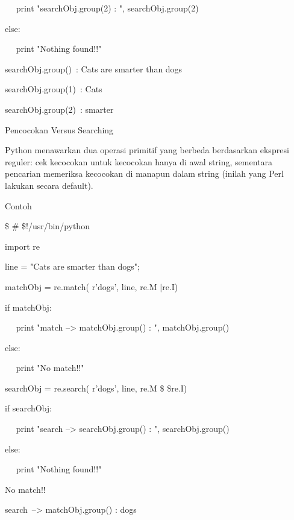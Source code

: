 \noindent 
~~ print "searchObj.group(2) : ", searchObj.group(2) \par
\noindent 
else: \par
\noindent 
~~ print "Nothing found!!" \par
\vspace{12pt}
\noindent 
searchObj.group()~:  Cats are smarter than dogs \par
\noindent 
searchObj.group(1)~:  Cats \par
\noindent 
searchObj.group(2)~:  smarter \par
\noindent 
Pencocokan Versus Searching \par
\vspace{12pt}
Python menawarkan dua operasi primitif yang berbeda berdasarkan ekspresi reguler: cek kecocokan untuk kecocokan hanya di awal string, sementara pencarian memeriksa kecocokan di manapun dalam string (inilah yang Perl lakukan secara default). \par
Contoh \par
\noindent 
 \$  \#  \$!/usr/bin/python \par
\noindent 
import re \par
\vspace{12pt}
\noindent 
line = "Cats are smarter than dogs"; \par
\vspace{12pt}
\noindent 
matchObj = re.match( r'dogs', line, re.M $  \vert  $re.I) \par
\noindent 
if matchObj: \par
\noindent 
~~ print "match --> matchObj.group() : ", matchObj.group() \par
\noindent 
else: \par
\noindent 
~~ print "No match!!" \par
\vspace{12pt}
\noindent 
searchObj = re.search( r'dogs', line, re.M \$  \vert  \$re.I) \par
\noindent 
if searchObj: \par
\noindent 
~~ print "search --> searchObj.group() : ", searchObj.group() \par
\noindent 
else: \par
\noindent 
~~ print "Nothing found!!" \par
\vspace{12pt}
\noindent 
No match!! \par
\noindent 
search~--> matchObj.group() :  dogs \par
\vspace{12pt}
